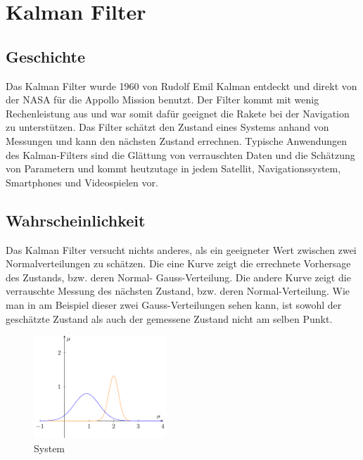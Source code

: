 %
%
%
%
%
%



\section{Kalman Filter}
\subsection{Geschichte}
Das Kalman Filter wurde 1960 von Rudolf Emil Kalman entdeckt und direkt von der NASA für die Appollo Mission benutzt. Der Filter kommt mit wenig Rechenleistung aus und war somit dafür geeignet die Rakete bei der Navigation zu unterstützen. Das Filter schätzt den Zustand eines Systems anhand von Messungen und kann den nächsten Zustand errechnen. Typische Anwendungen des Kalman-Filters sind die Glättung von verrauschten Daten und die Schätzung von Parametern und kommt heutzutage in jedem Satellit, Navigationssystem, Smartphones und Videospielen vor.

\subsection{Wahrscheinlichkeit}
Das Kalman Filter versucht nichts anderes, als ein geeigneter Wert zwischen zwei Normalverteilungen zu schätzen. Die eine Kurve zeigt die errechnete Vorhersage des Zustands, bzw. deren Normal- Gauss-Verteilung. Die andere Kurve zeigt die verrauschte Messung des nächsten Zustand, bzw. deren Normal-Verteilung. Wie man in am Beispiel dieser zwei Gauss-Verteilungen sehen kann, ist sowohl der geschätzte Zustand als auch der gemessene Zustand nicht am selben Punkt. 



\begin{figure}
 \begin{center}
 \includegraphics[width=5cm]{papers/erdbeben/Gausskurve2.pdf}
 \caption{System}
 \end{center}
\end{figure}



